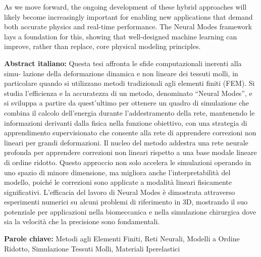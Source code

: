 \documentclass[11pt,a4paper]{article}
\numberwithin{equation}{section}
\newcommand{\abstractita}{Questa tesi affronta le sfide computazionali inerenti alla simu-
lazione della deformazione dinamica e non lineare dei tessuti molli, in particolare quando si utilizzano
metodi tradizionali agli elementi finiti (FEM). Si studia l'efficienza e la accuratezza di un metodo, denominato “Neural Modes”, e si sviluppa a partire da quest'ultimo per ottenere un quadro di simulazione che combina il calcolo dell'energia durante
l'addestramento della rete, mantenendo le informazioni derivanti dalla fisica nella funzione obiettivo, con una
strategia di apprendimento supervisionato che consente alla rete di apprendere correzioni non lineari per
grandi deformazioni. Il nucleo del metodo addestra una rete neurale profonda per apprendere
correzioni non lineari rispetto a una base modale lineare di ordine ridotto. Questo approccio non
solo accelera le simulazioni operando in uno spazio di minore dimensione, ma
migliora anche l'interpretabilità del modello, poiché le correzioni sono applicate
a modalità lineari fisicamente significativi. L'efficacia del lavoro di Neural Modes
è dimostrata attraverso esperimenti numerici su alcuni problemi di riferimento in 3D,
mostrando il suo potenziale per applicazioni nella biomeccanica e nella simulazione chirurgica
dove sia la velocità che la precisione sono fondamentali.
}
\newcommand{\keywordsita}{Metodi agli Elementi Finiti, Reti Neurali, Modelli a Ordine Ridotto, Simulazione Tessuti Molli, Materiali Iperelastici}
\begin{document}
As we move forward, the ongoing development of these hybrid approaches will likely become increasingly important for enabling new applications that demand both accurate physics and real-time performance. The Neural Modes framework lays a foundation for this, showing that well-designed machine learning can improve, rather than replace, core physical modeling principles.
\newpage
\printbibliography

\newpage
\textbf{Abstract italiano:} \abstractita

\begin{tcolorbox}[arc=0pt, boxrule=0pt, colback=bluePoli!60, width=\textwidth, colupper=white]
        \textbf{Parole chiave:} \keywordsita
    \end{tcolorbox}
\end{document}
